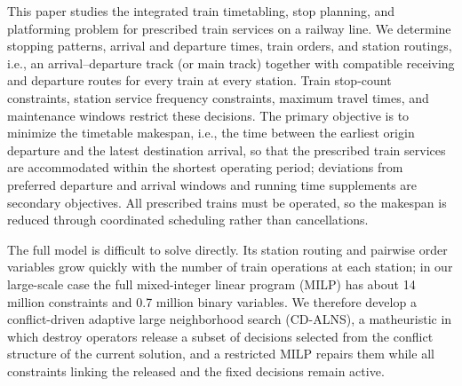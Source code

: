 This paper studies the integrated train timetabling, stop planning, and platforming problem for prescribed train services on a railway line. We determine stopping patterns, arrival and departure times, train orders, and station routings, i.e., an arrival--departure track (or main track) together with compatible receiving and departure routes for every train at every station. Train stop-count constraints, station service frequency constraints, maximum travel times, and maintenance windows restrict these decisions. The primary objective is to minimize the timetable makespan, i.e., the time between the earliest origin departure and the latest destination arrival, so that the prescribed train services are accommodated within the shortest operating period; deviations from preferred departure and arrival windows and running time supplements are secondary objectives. All prescribed trains must be operated, so the makespan is reduced through coordinated scheduling rather than cancellations.

The full model is difficult to solve directly. Its station routing and pairwise order variables grow quickly with the number of train operations at each station; in our large-scale case the full mixed-integer linear program (MILP) has about 14 million constraints and 0.7 million binary variables. We therefore develop a conflict-driven adaptive large neighborhood search (CD-ALNS), a matheuristic in which destroy operators release a subset of decisions selected from the conflict structure of the current solution, and a restricted MILP repairs them while all constraints linking the released and the fixed decisions remain active.

